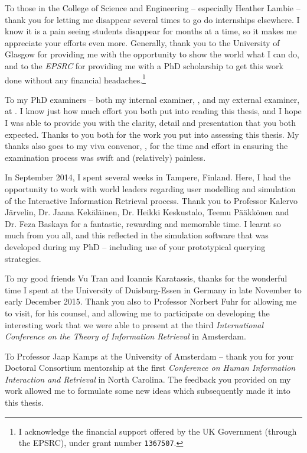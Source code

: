 \begin{preamble}
To those in the College of Science and Engineering -- especially Heather Lambie -- thank you for letting me disappear several times to go do internships elsewhere. I know it is a pain seeing students disappear for months at a time, so it makes me appreciate your efforts even more. Generally, thank you to the University of Glasgow for providing me with the opportunity to show the world what I can do, and to the \emph{EPSRC} for providing me with a PhD scholarship to get this work done without any financial headaches.\footnote{I acknowledge the financial support offered by the UK Government (through the EPSRC), under grant number \texttt{1367507}.}

To my PhD examiners -- both my internal examiner, , and my external examiner,  at . I know just how much effort you both put into reading this thesis, and I hope I was able to provide you with the clarity, detail and presentation that you both expected. Thanks to you both for the work you put into assessing this thesis. My thanks also goes to my viva convenor, , for the time and effort in ensuring the examination process was swift and (relatively) painless.

In September 2014, I spent several weeks in Tampere, Finland. Here, I had the opportunity to work with world leaders regarding user modelling and simulation of the Interactive Information Retrieval process. Thank you to Professor Kalervo J\"{a}rvelin, Dr. Jaana Kek\"{a}l\"{a}inen, Dr. Heikki Keskustalo, Teemu P\"{a}\"{a}kk\"{o}nen and Dr. Feza Baskaya for a fantastic, rewarding and memorable time. I learnt so much from you all, and this reflected in the simulation software that was developed during my PhD -- including use of your prototypical querying strategies.

To my good friends Vu Tran and Ioannis Karatassis, thanks for the wonderful time I spent at the University of Duisburg-Essen in Germany in late November to early December 2015. Thank you also to Professor Norbert Fuhr for allowing me to visit, for his counsel, and allowing me to participate on developing the interesting work that we were able to present at the third \emph{International Conference on the Theory of Information Retrieval} in Amsterdam.

To Professor Jaap Kamps at the University of Amsterdam -- thank you for your Doctoral Consortium mentorship at the first \emph{Conference on Human Information Interaction and Retrieval} in North Carolina. The feedback you provided on my work allowed me to formulate some new ideas which subsequently made it into this thesis.


\end{preamble}
